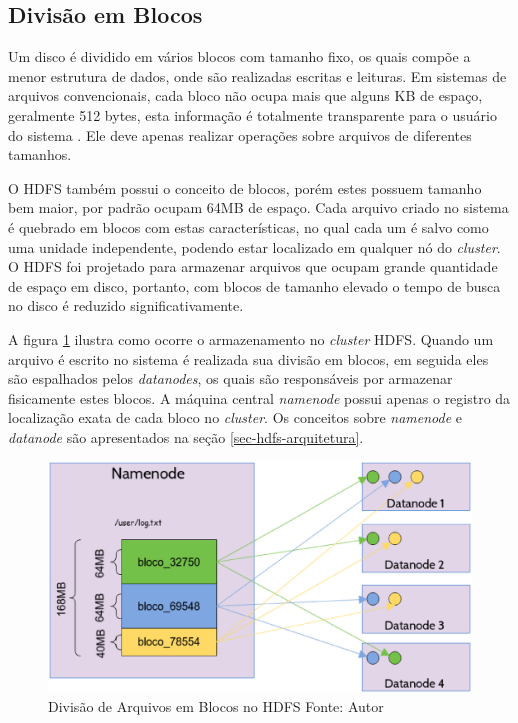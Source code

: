 \subsection{Divisão em Blocos}

Um disco é dividido em vários blocos com tamanho fixo, os quais compõe a menor estrutura de dados, onde são realizadas escritas e leituras. Em sistemas de arquivos convencionais, cada bloco não ocupa mais que alguns KB de espaço, geralmente 512 bytes, esta informação é totalmente transparente para o usuário do sistema \cite{white2012}. Ele deve apenas realizar operações sobre arquivos de diferentes tamanhos.

O HDFS também possui o conceito de blocos, porém estes possuem tamanho bem maior, por padrão ocupam 64MB de espaço. Cada arquivo criado no sistema é quebrado em blocos com estas características, no qual cada um é salvo como uma unidade independente, podendo estar localizado em qualquer nó do \textit{cluster}. O HDFS foi projetado para armazenar arquivos que ocupam grande quantidade de espaço em disco, portanto, com blocos de tamanho elevado o tempo de busca no disco é reduzido significativamente.

A figura \ref{fig-hdfs-blocos} ilustra como ocorre o armazenamento no \textit{cluster} HDFS. Quando um arquivo é escrito no sistema é realizada sua divisão em blocos, em seguida eles são espalhados pelos \textit{datanodes}, os quais são responsáveis por armazenar fisicamente estes blocos. A máquina central \textit{namenode} possui apenas o registro da localização exata de cada bloco no \textit{cluster}. Os conceitos sobre \textit{namenode} e \textit{datanode} são apresentados na seção \ref{sec-hdfs-arquitetura}.

\begin{figure}[ht!]
	\centering
	\includegraphics[keepaspectratio=true,scale=0.5]
	  {figuras/hdfs-blocos.eps}
	\caption[Divisão de Arquivos em Blocos no HDFS]{Divisão de Arquivos em Blocos no HDFS
	\protect\linebreak Fonte: Autor}
	\label{fig-hdfs-blocos}
\end{figure}
\FloatBarrier

